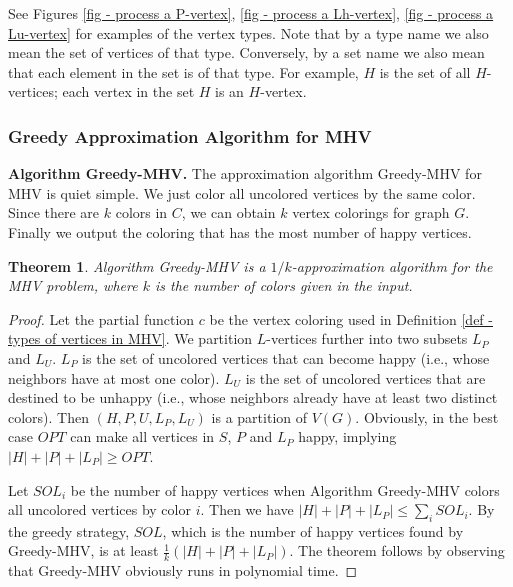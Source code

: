 \documentclass[11pt]{article}
\newtheorem{theorem}{Theorem}[section]
\newcommand{\qed}{\vrule height4pt width4pt depth2pt}
\begin{document}
See Figures \ref{fig - process a P-vertex}, \ref{fig - process a Lh-vertex},
\ref{fig - process a Lu-vertex} for examples of the vertex types.
Note that by a type name we also mean the set of vertices of that type.
Conversely, by a set name we also mean that each element in the set
is of that type. For example, $H$ is the set of all $H$-vertices;
each vertex in the set $H$ is an $H$-vertex.




\subsubsection{Greedy Approximation Algorithm for MHV}
\label{subsec - greedy approxalg for MHV}
{\bf Algorithm {\sc Greedy-MHV}.}
The approximation algorithm {\sc Greedy-MHV} for MHV is quiet simple.
We just color all uncolored vertices by the same color.
Since there are $k$ colors in $C$, we can obtain $k$ vertex colorings for
graph $G$. Finally we output the coloring that has the most number of
happy vertices.

\begin{theorem}
\label{th - 1/k-approximation for MHV}
Algorithm {\sc Greedy-MHV} is a $1/k$-approximation algorithm for the MHV
problem, where $k$ is the number of colors given in the input.
\end{theorem}
\begin{proof}
Let the partial function $c$ be the vertex coloring used in Definition
\ref{def - types of vertices in MHV}.
We partition $L$-vertices further into two subsets $L_P$ and $L_U$.
$L_P$ is the set of uncolored vertices that can become happy (i.e., whose
neighbors have at most one color). $L_U$ is the set of uncolored vertices
that are destined to be unhappy (i.e., whose neighbors already have
at least two distinct colors). Then $(H, P, U, L_P, L_U)$ is a partition of
$V(G)$. Obviously, in the best case $OPT$ can make all vertices in $S$, $P$
and $L_P$ happy, implying $|H| + |P| + |L_P| \geq OPT$.

Let $SOL_i$ be the number of happy vertices when Algorithm {\sc Greedy-MHV}
colors all uncolored vertices by color $i$.
Then we have $|H| + |P| + |L_P| \leq \sum_i SOL_i$.
By the greedy strategy, $SOL$, which is the number of happy vertices found
by {\sc Greedy-MHV}, is at least $\frac1k (|H| + |P| + |L_P|)$.
The theorem follows by observing that {\sc Greedy-MHV} obviously runs in
polynomial time.
\qed
\end{proof}
\end{document}
